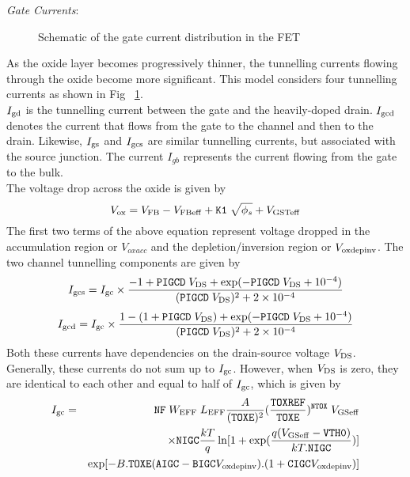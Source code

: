 \documentclass{article}
\begin{document}
{\it Gate Currents}:\\
\begin{figure}
\epsfxsize=3in\centerline{}
\caption{\label{gate.currents}Schematic of the gate current
distribution in the FET}
\end{figure}
As the oxide layer becomes progressively thinner, the tunnelling
currents flowing through the oxide become more significant. This
model considers four tunnelling
currents as shown in Fig ~\ref{gate.currents}. \\
\indent $I_{\rm{gd}}$ is the tunnelling current between the gate
and the heavily-doped drain. $I_{\rm{gcd}}$ denotes the current
that flows from the gate to the channel and then to the drain.
Likewise, $I_{\rm{gs}}$ and $I_{\rm{gcs}}$ are similar tunnelling
currents, but associated with the source junction. The current
$I_{gb}$ represents the current flowing from the gate to the bulk.\\
\noindent The voltage drop across the oxide is given by
\begin{equation}
V_{\rm{ox}} = V_{\rm{FB}} - V_{\rm{FBeff}} + \texttt{K1} \;
\sqrt{\phi_s} + V_{\rm{GSTeff}}
\end{equation}
The first two terms of the above equation represent voltage
dropped in the accumulation region or $V_{oxacc}$ and the
depletion/inversion region or $V_{\rm{oxdepinv}}$. The two channel
tunnelling components are given by
\begin{equation}
I_{\rm{gcs}} = I_{\rm{gc}} \times {-1 + \texttt{PIGCD}\;
V_{\rm{DS}} + \exp(-\texttt{PIGCD}\; V_{\rm{DS}} + 10^{-4}) \over
(\texttt{PIGCD}\; V_{\rm{DS}})^2 + 2 \times 10^{-4}}
\end{equation}
\begin{equation}
I_{\rm{gcd}} = I_{\rm{gc}} \times {1 - (1 +
\texttt{PIGCD}\;V_{\rm{DS}}) + \exp(-\texttt{PIGCD}\;V_{\rm{DS}} +
10^{-4}) \over (\texttt{PIGCD}\;V_{\rm{DS}})^2 + 2 \times 10^{-4}}
\end{equation}
Both these currents have dependencies on the drain-source voltage
$V_{\rm{DS}}$. Generally, these currents do not sum up to
$I_{\rm{gc}}$. However, when $V_{\rm{DS}}$ is zero, they are
identical to each other and equal to half of $I_{\rm{gc}}$, which
is given by
\begin{eqnarray}
I_{\rm{gc}}& = & \texttt{NF} \; W_{\rm{EFF}} \; L_{\rm{EFF}} {A
\over (\texttt{TOXE})^2}
({\texttt{TOXREF} \over \texttt{TOXE}})^{\texttt{NTOX}} \; V_{\rm{GSeff}} \nonumber \\
  & & \times \texttt{NIGC} {kT\over q} \ln [1 + \exp({q(V_{\rm{GSeff}} - \texttt{VTH0}) \over
  kT.\texttt{NIGC}})] \nonumber \\
  & & \exp[-B . \texttt{TOXE}(\texttt{AIGC} - \texttt{BIGC}V_{\rm{oxdepinv}}).(1 +
  \texttt{CIGC}V_{\rm{oxdepinv}})]
\end{eqnarray}
\end{document}
